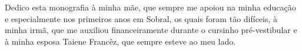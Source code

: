 Dedico esta monografia à minha mãe, que sempre me apoiou na minha
educação e especialmente nos primeiros anos em Sobral, os quais foram
tão difíceis, à minha irmã, que me auxiliou financeiramente durante o
cursinho pré-vestibular e à minha esposa Taiene Francêz, que sempre esteve ao meu lado.\@
